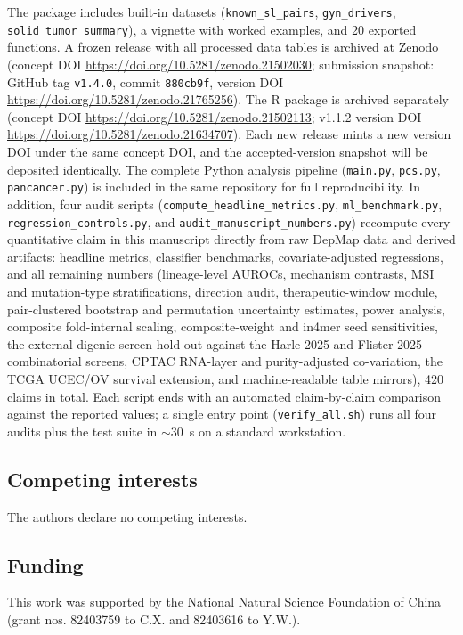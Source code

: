 \documentclass[11pt,a4paper]{article}
\begin{document}
\noindent The package includes built-in datasets (\texttt{known\_sl\_pairs}, \texttt{gyn\_drivers}, \texttt{solid\_tumor\_summary}), a vignette with worked examples, and 20 exported functions. A frozen release with all processed data tables is archived at Zenodo (concept DOI \url{https://doi.org/10.5281/zenodo.21502030}; submission snapshot: GitHub tag \texttt{v1.4.0}, commit \texttt{880cb9f}, version DOI \url{https://doi.org/10.5281/zenodo.21765256}). The R package is archived separately (concept DOI \url{https://doi.org/10.5281/zenodo.21502113}; v1.1.2 version DOI \url{https://doi.org/10.5281/zenodo.21634707}). Each new release mints a new version DOI under the same concept DOI, and the accepted-version snapshot will be deposited identically. The complete Python analysis pipeline (\texttt{main.py}, \texttt{pcs.py}, \texttt{pancancer.py}) is included in the same repository for full reproducibility. In addition, four audit scripts (\texttt{compute\_headline\_metrics.py}, \texttt{ml\_benchmark.py}, \texttt{regression\_controls.py}, and \texttt{audit\_manuscript\_numbers.py}) recompute every quantitative claim in this manuscript directly from raw DepMap data and derived artifacts: headline metrics, classifier benchmarks, covariate-adjusted regressions, and all remaining numbers (lineage-level AUROCs, mechanism contrasts, MSI and mutation-type stratifications, direction audit, therapeutic-window module, pair-clustered bootstrap and permutation uncertainty estimates, power analysis, composite fold-internal scaling, composite-weight and in4mer seed sensitivities, the external digenic-screen hold-out against the Harle 2025 and Flister 2025 combinatorial screens, CPTAC RNA-layer and purity-adjusted co-variation, the TCGA UCEC/OV survival extension, and machine-readable table mirrors), 420 claims in total. Each script ends with an automated claim-by-claim comparison against the reported values; a single entry point (\texttt{verify\_all.sh}) runs all four audits plus the test suite in $\sim$30~s on a standard workstation.

\subsection*{Competing interests}
The authors declare no competing interests.

\subsection*{Funding}
This work was supported by the National Natural Science Foundation of China (grant nos. 82403759 to C.X. and 82403616 to Y.W.).
\end{document}
